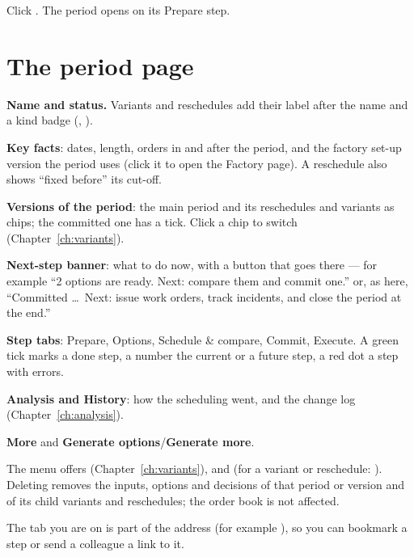 Click . The period opens on its Prepare step.

\section{The period page}\label{sec:period-page}


\begin{callouts}
  \item[1] \textbf{Name and status.} Variants and reschedules add their label after the name and a kind badge
           (, ).
  \item[2] \textbf{Key facts}: dates, length, orders in and after the period, and the factory set-up version
           the period uses (click it to open the Factory page). A reschedule also shows ``fixed before'' its
           cut-off.
  \item[3] \textbf{Versions of the period}: the main period and its reschedules and variants as chips; the
           committed one has a tick. Click a chip to switch (Chapter~\ref{ch:variants}).
  \item[4] \textbf{Next-step banner}: what to do now, with a button that goes there --- for example
           ``2 options are ready. Next: compare them and commit one.'' or, as here, ``Committed \dots\ Next:
           issue work orders, track incidents, and close the period at the end.''
  \item[5] \textbf{Step tabs}: Prepare, Options, Schedule \& compare, Commit, Execute. A green tick marks a done
           step, a number the current or a future step, a red dot a step with errors.
  \item[6] \textbf{Analysis and History}: how the scheduling went, and the change log (Chapter~\ref{ch:analysis}).
  \item[7] \textbf{More} and \textbf{Generate options}/\textbf{Generate more}.
\end{callouts}


The  menu offers  (Chapter~\ref{ch:variants}), 
and  (for a variant or reschedule: ). Deleting removes
the inputs, options and decisions of that period or version and of its child variants and reschedules; the
order book is not affected.

\begin{note}
The tab you are on is part of the address (for example ), so you can bookmark a step or
send a colleague a link to it.
\end{note}
